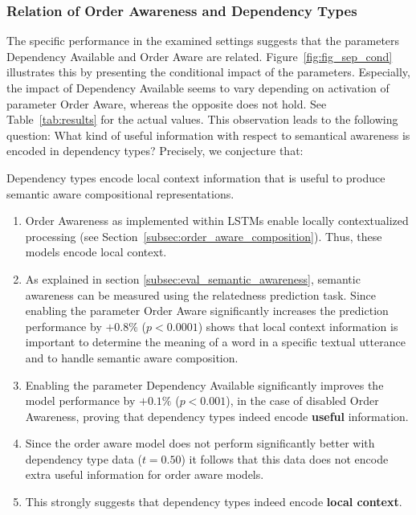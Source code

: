 \subsubsection{Relation of Order Awareness and Dependency Types} \label{subsec:results_relation_OA_DA}
The specific performance in the examined settings suggests that the parameters Dependency Available and Order Aware are related. Figure~\ref{fig:fig_sep_cond} illustrates this by presenting the conditional impact of the parameters. Especially, the impact of Dependency Available seems to vary depending on activation of parameter Order Aware, whereas the opposite does not hold. See Table~\ref{tab:results} for the actual values. This observation leads to the following question: What kind of useful information with respect to semantical awareness is encoded in dependency types? Precisely, we conjecture %
that:

\begin{conjecture}
	Dependency types encode local context information that is useful to produce semantic aware compositional representations.
\end{conjecture}	
\begin{rationale}
	\begin{enumerate}
		\item Order Awareness as implemented within \ac{LSTM}s enable locally contextualized processing (see Section~\ref{subsec:order_aware_composition}). Thus, these models encode local context.
		\item As explained in section \ref{subsec:eval_semantic_awareness}, semantic awareness can be measured using the relatedness prediction task. Since enabling the parameter Order Aware significantly increases the prediction performance by $+0.8\%$ ($p < 0.0001$) shows that local context information is important to determine the meaning of a word in a specific textual utterance and to handle semantic aware composition.
		\item Enabling the parameter Dependency Available significantly improves the model performance by $+0.1\%$ ($p < 0.001$), in the case of disabled Order Awareness, proving that dependency types indeed encode \textbf{useful} information.
		\item Since the order aware model does not perform significantly better with dependency type data ($t = 0.50$) it follows that this data does not encode extra useful information for order aware models.
		\item This strongly suggests that dependency types indeed encode \textbf{local context}.
	\end{enumerate}
\end{rationale}

